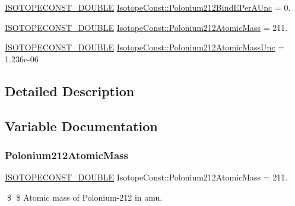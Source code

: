 \begin{DoxyCompactItemize}
\mbox{\hyperlink{group___isotope_const-_macros_ga8f45a7272ce02c0b4c65c44636ed719a}{I\+S\+O\+T\+O\+P\+E\+C\+O\+N\+S\+T\+\_\+\+D\+O\+U\+B\+LE}} \mbox{\hyperlink{group___isotope_const-_polonium-_po212_gaca3aa0a4df7baaae775e83ad1582486b}{Isotope\+Const\+::\+Polonium212\+Bind\+E\+Per\+A\+Unc}} = 0.
\item 
\mbox{\hyperlink{group___isotope_const-_macros_ga8f45a7272ce02c0b4c65c44636ed719a}{I\+S\+O\+T\+O\+P\+E\+C\+O\+N\+S\+T\+\_\+\+D\+O\+U\+B\+LE}} \mbox{\hyperlink{group___isotope_const-_polonium-_po212_ga46cef4efc24b0d368ec1629510a59206}{Isotope\+Const\+::\+Polonium212\+Atomic\+Mass}} = 211.
\item 
\mbox{\hyperlink{group___isotope_const-_macros_ga8f45a7272ce02c0b4c65c44636ed719a}{I\+S\+O\+T\+O\+P\+E\+C\+O\+N\+S\+T\+\_\+\+D\+O\+U\+B\+LE}} \mbox{\hyperlink{group___isotope_const-_polonium-_po212_ga1aa7438e32d2a7b2d2449a2100d6dd52}{Isotope\+Const\+::\+Polonium212\+Atomic\+Mass\+Unc}} = 1.\+236e-\/06
\end{DoxyCompactItemize}


\subsection{Detailed Description}


\subsection{Variable Documentation}
\mbox{\label{group___isotope_const-_polonium-_po212_ga46cef4efc24b0d368ec1629510a59206}} 
\subsubsection{\texorpdfstring{Polonium212\+Atomic\+Mass}{Polonium212AtomicMass}}
{\footnotesize\ttfamily \mbox{\hyperlink{group___isotope_const-_macros_ga8f45a7272ce02c0b4c65c44636ed719a}{I\+S\+O\+T\+O\+P\+E\+C\+O\+N\+S\+T\+\_\+\+D\+O\+U\+B\+LE}} Isotope\+Const\+::\+Polonium212\+Atomic\+Mass = 211.}

\$ \$ Atomic mass of Polonium-\/212 in amu. \mbox{\label{group___isotope_const-_polonium-_po212_ga1aa7438e32d2a7b2d2449a2100d6dd52}} 
